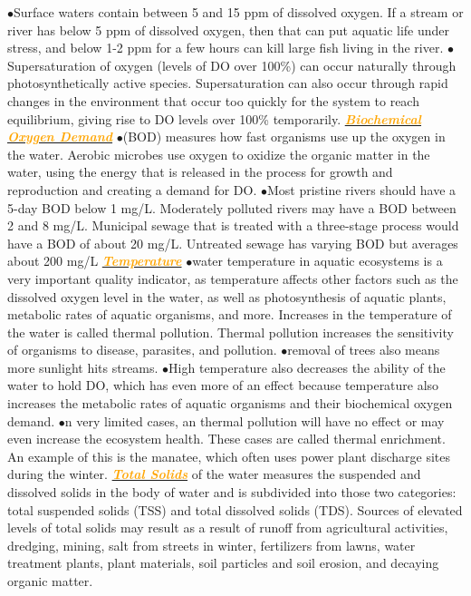 \documentclass{article}
\newcommand{\ddd}{$\bullet$}
\newcommand{\orange}[1]{\textcolor{orange}{#1}}
\newcommand{\mysubsection}[1]{\underline{\textbf{{\textit{\orange{#1}}}}}}
\begin{document}
\begin{multicols*}{4}
            \ddd Surface waters contain between 5 and 15 ppm of dissolved oxygen. If a stream or river has below 5 ppm of dissolved oxygen, then that can put aquatic life under stress, and below 1-2 ppm for a few hours can kill large fish living in the river.
            \ddd Supersaturation of oxygen (levels of DO over 100\%) can occur naturally through photosynthetically active species. Supersaturation can also occur through rapid changes in the environment that occur too quickly for the system to reach equilibrium, giving rise to DO levels over 100\% temporarily. 
        \mysubsection{Biochemical Oxygen Demand}
            \ddd (BOD) measures how fast organisms use up the oxygen in the water. Aerobic microbes use oxygen to oxidize the organic matter in the water, using the energy that is released in the process for growth and reproduction and creating a demand for DO.
            \ddd Most pristine rivers should have a 5-day BOD below 1 mg/L. Moderately polluted rivers may have a BOD between 2 and 8 mg/L. Municipal sewage that is treated with a three-stage process would have a BOD of about 20 mg/L. Untreated sewage has varying BOD but averages about 200 mg/L    
        \mysubsection{Temperature}
            \ddd water temperature in aquatic ecosystems is a very important quality indicator, as temperature affects other factors such as the dissolved oxygen level in the water, as well as photosynthesis of aquatic plants, metabolic rates of aquatic organisms, and more. Increases in the temperature of the water is called thermal pollution. Thermal pollution increases the sensitivity of organisms to disease, parasites, and pollution.
            \ddd removal of trees also means more sunlight hits streams. 
            \ddd  High temperature also decreases the ability of the water to hold DO, which has even more of an effect because temperature also increases the metabolic rates of aquatic organisms and their biochemical oxygen demand. 
            \ddd n very limited cases, an thermal pollution will have no effect or may even increase the ecosystem health. These cases are called thermal enrichment. An example of this is the manatee, which often uses power plant discharge sites during the winter.
        \mysubsection{Total Solids} of the water measures the suspended and dissolved solids in the body of water and is subdivided into those two categories: total suspended solids (TSS) and total dissolved solids (TDS). Sources of elevated levels of total solids may result as a result of runoff from agricultural activities, dredging, mining, salt from streets in winter, fertilizers from lawns, water treatment plants, plant materials, soil particles and soil erosion, and decaying organic matter.
        
\end{multicols*}
\end{document}
